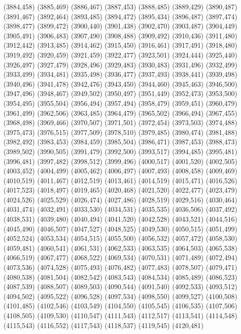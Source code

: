 (3884,458)
(3885,469)
(3886,467)
(3887,453)
(3888,485)
(3889,429)
(3890,487)
(3891,467)
(3892,464)
(3893,485)
(3894,472)
(3895,434)
(3896,487)
(3897,474)
(3898,477)
(3899,472)
(3900,440)
(3901,438)
(3902,470)
(3903,487)
(3904,449)
(3905,491)
(3906,483)
(3907,490)
(3908,488)
(3909,492)
(3910,436)
(3911,480)
(3912,442)
(3913,485)
(3914,462)
(3915,450)
(3916,461)
(3917,491)
(3918,480)
(3919,492)
(3920,459)
(3921,459)
(3922,477)
(3923,501)
(3924,444)
(3925,440)
(3926,497)
(3927,479)
(3928,496)
(3929,483)
(3930,483)
(3931,496)
(3932,499)
(3933,499)
(3934,481)
(3935,498)
(3936,477)
(3937,493)
(3938,441)
(3939,498)
(3940,496)
(3941,478)
(3942,476)
(3943,450)
(3944,460)
(3945,463)
(3946,500)
(3947,496)
(3948,467)
(3949,502)
(3950,497)
(3951,449)
(3952,473)
(3953,500)
(3954,495)
(3955,504)
(3956,494)
(3957,494)
(3958,479)
(3959,451)
(3960,479)
(3961,499)
(3962,506)
(3963,485)
(3964,479)
(3965,502)
(3966,494)
(3967,455)
(3968,498)
(3969,466)
(3970,507)
(3971,501)
(3972,454)
(3973,503)
(3974,488)
(3975,473)
(3976,515)
(3977,509)
(3978,510)
(3979,485)
(3980,474)
(3981,488)
(3982,492)
(3983,453)
(3984,459)
(3985,504)
(3986,471)
(3987,453)
(3988,473)
(3989,502)
(3990,505)
(3991,479)
(3992,500)
(3993,517)
(3994,485)
(3995,481)
(3996,481)
(3997,482)
(3998,512)
(3999,496)
(4000,517)
(4001,520)
(4002,505)
(4003,452)
(4004,499)
(4005,462)
(4006,497)
(4007,493)
(4008,458)
(4009,469)
(4010,519)
(4011,467)
(4012,519)
(4013,461)
(4014,519)
(4015,471)
(4016,526)
(4017,523)
(4018,497)
(4019,465)
(4020,468)
(4021,520)
(4022,477)
(4023,479)
(4024,526)
(4025,529)
(4026,474)
(4027,486)
(4028,519)
(4029,516)
(4030,464)
(4031,474)
(4032,491)
(4033,530)
(4034,531)
(4035,535)
(4036,506)
(4037,492)
(4038,531)
(4039,480)
(4040,494)
(4041,520)
(4042,528)
(4043,521)
(4044,516)
(4045,490)
(4046,507)
(4047,527)
(4048,525)
(4049,530)
(4050,515)
(4051,499)
(4052,524)
(4053,534)
(4054,515)
(4055,500)
(4056,532)
(4057,472)
(4058,530)
(4059,481)
(4060,541)
(4061,531)
(4062,533)
(4063,535)
(4064,503)
(4065,538)
(4066,519)
(4067,477)
(4068,522)
(4069,534)
(4070,531)
(4071,489)
(4072,494)
(4073,536)
(4074,528)
(4075,493)
(4076,482)
(4077,483)
(4078,507)
(4079,471)
(4080,538)
(4081,504)
(4082,542)
(4083,543)
(4084,534)
(4085,489)
(4086,523)
(4087,539)
(4088,507)
(4089,503)
(4090,544)
(4091,540)
(4092,533)
(4093,512)
(4094,502)
(4095,522)
(4096,528)
(4097,534)
(4098,550)
(4099,527)
(4100,508)
(4101,485)
(4102,546)
(4103,549)
(4104,550)
(4105,545)
(4106,535)
(4107,506)
(4108,505)
(4109,530)
(4110,547)
(4111,543)
(4112,517)
(4113,541)
(4114,548)
(4115,543)
(4116,552)
(4117,543)
(4118,537)
(4119,545)
(4120,481)
